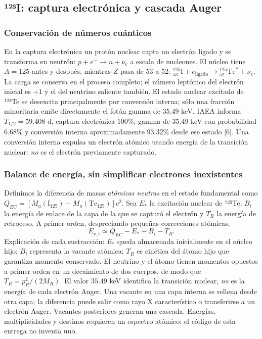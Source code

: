 \documentclass[11pt,a4paper,oneside]{article}
\begin{document}
\subsection{¹²⁵I: captura electrónica y cascada Auger}\label{i-captura-electruxf3nica-y-cascada-auger}

\subsubsection{Conservación de números cuánticos}\label{conservaciuxf3n-de-nuxfameros-cuuxe1nticos}

En la captura electrónica un protón nuclear capta un electrón ligado y se transforma en neutrón: \(p+e^-\rightarrow n+\nu_e\) a escala de nucleones. El núcleo tiene \(A=125\) antes y después, mientras \(Z\) pasa de 53 a 52: \(^{125}_{53}\mathrm{I}+e^-_{\mathrm{ligado}}\to{}^{125}_{52}\mathrm{Te}^*+\nu_e\). La carga se conserva en el proceso completo; el número leptónico del electrón inicial es \(+1\) y el del neutrino saliente también. El estado nuclear excitado de ¹²⁵Te se desexcita principalmente por conversión interna; sólo una fracción minoritaria emite directamente el fotón gamma de \(35.49\) keV. IAEA informa \(T_{1/2}=59.408\) d, captura electrónica \(100\%\), gamma de \(35.49\) keV con probabilidad \(6.68\%\) y conversión interna aproximadamente \(93.32\%\) desde ese estado {[}6{]}. Una conversión interna expulsa un electrón atómico usando energía de la transición nuclear: \emph{no} es el electrón previamente capturado.

\subsubsection{Balance de energía, sin simplificar electrones inexistentes}\label{balance-de-energuxeda-sin-simplificar-electrones-inexistentes}

Definimos la diferencia de masas \emph{atómicas neutras} en el estado fundamental como \(Q_{EC}=[M_a(\mathrm{I}_{125})-M_a(\mathrm{Te}_{125})]c^2\). Sea \(E_*\) la excitación nuclear de ¹²⁵Te, \(B_i\) la energía de enlace de la capa de la que se capturó el electrón y \(T_R\) la energía de retroceso. A primer orden, despreciando pequeñas correcciones atómicas, \[E_{\nu,i}\simeq Q_{EC}-E_*-B_i-T_R.\] Explicación de cada sustracción: \(E_*\) queda almacenada inicialmente en el núcleo hijo; \(B_i\) representa la vacante atómica; \(T_R\) es cinética del átomo hijo que garantiza momento conservado. El neutrino y el átomo tienen momentos opuestos a primer orden en un decaimiento de dos cuerpos, de modo que \(T_R=p_R^2/(2M_R)\). El valor \(35.49\) keV identifica la transición nuclear, \emph{no} es la energía de cada electrón Auger. Una vacante en una capa interna se rellena desde otra capa; la diferencia puede salir como rayo X característico o transferirse a un electrón Auger. Vacantes posteriores generan una cascada. Energías, multiplicidades y destinos requieren un espectro atómico; el código de esta entrega no inventa uno.
\end{document}
